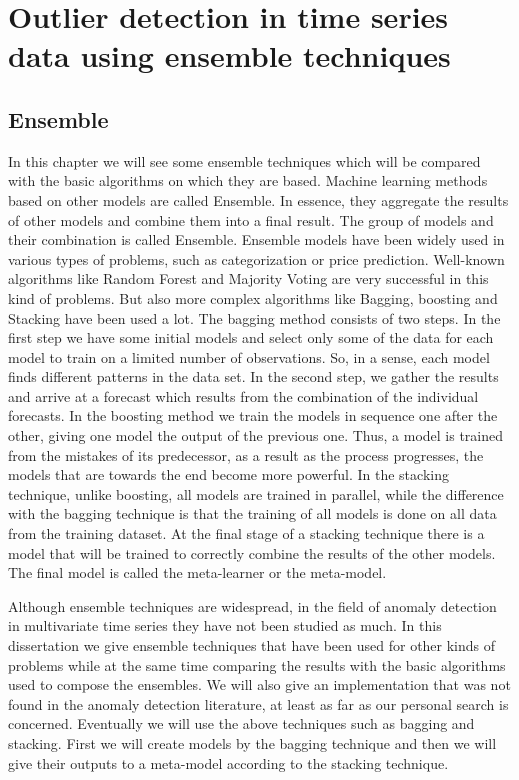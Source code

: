 \documentclass[a4paper,12pt]{report}
\theoremstyle{definitionNODot}
\begin{document}
	
	\chapter{Outlier detection in time series data using ensemble techniques}
	\section{Ensemble}
	In this chapter we will see some ensemble techniques which will be compared with the basic algorithms on which they are based. Machine learning methods based on other models are called Ensemble. In essence, they aggregate the results of other models and combine them into a final result. The group of models and their combination is called Ensemble. Ensemble models have been widely used in various types of problems, such as categorization or price prediction. Well-known algorithms like Random Forest and Majority Voting are very successful in this kind of problems. But also more complex algorithms like Bagging, boosting and Stacking have been used a lot. The bagging method consists of two steps. In the first step we have some initial models and select only some of the data for each model to train on a limited number of observations. So, in a sense, each model finds different patterns in the data set. In the second step, we gather the results and arrive at a forecast which results from the combination of the individual forecasts. In the boosting method we train the models in sequence one after the other, giving one model the output of the previous one. Thus, a model is trained from the mistakes of its predecessor, as a result as the process progresses, the models that are towards the end become more powerful. In the stacking technique, unlike boosting, all models are trained in parallel, while the difference with the bagging technique is that the training of all models is done on all data from the training dataset. At the final stage of a stacking technique there is a model that will be trained to correctly combine the results of the other models. The final model is called the meta-learner or the meta-model. 
	
	Although ensemble techniques are widespread, in the field of anomaly detection in multivariate time series they have not been studied as much. In this dissertation we give ensemble techniques that have been used for other kinds of problems while at the same time comparing the results with the basic algorithms used to compose the ensembles. We will also give an implementation that was not found in the anomaly detection literature, at least as far as our personal search is concerned. Eventually we will use the above techniques such as bagging and stacking. First we will create models by the bagging technique and then we will give their outputs to a meta-model according to the stacking technique. 
	
\end{document}
